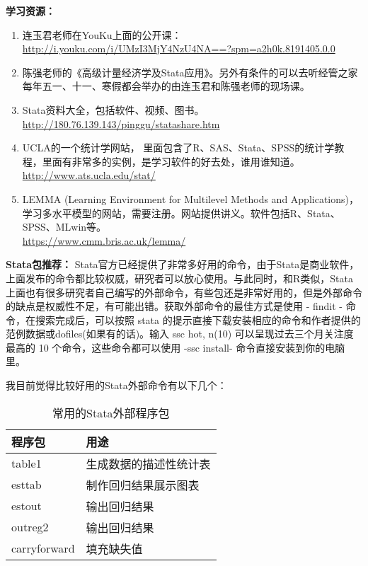 \documentclass[11pt, a4paper]{article}
\begin{document}
\textbf{学习资源：}
\begin{enumerate}[(1)]
	\item 连玉君老师在YouKu上面的公开课：\\ \url{http://i.youku.com/i/UMzI3MjY4NzU4NA==?spm=a2h0k.8191405.0.0}
	\item 陈强老师的《高级计量经济学及Stata应用》。另外有条件的可以去听经管之家每年五一、十一、寒假都会举办的由连玉君和陈强老师的现场课。
	\item Stata资料大全，包括软件、视频、图书。\\ \url{http://180.76.139.143/pinggu/statashare.htm}
	\item UCLA的一个统计学网站， 里面包含了R、SAS、Stata、SPSS的统计学教程，里面有非常多的实例，是学习软件的好去处，谁用谁知道。\\ \url{http://www.ats.ucla.edu/stat/}
	\item LEMMA (Learning Environment for Multilevel Methods and Applications)，学习多水平模型的网站，需要注册。网站提供讲义。软件包括R、Stata、SPSS、MLwin等。\\ \url{https://www.cmm.bris.ac.uk/lemma/}
\end{enumerate}

\textbf{Stata包推荐：}
Stata官方已经提供了非常多好用的命令，由于Stata是商业软件，上面发布的命令都比较权威，研究者可以放心使用。与此同时，和R类似，Stata上面也有很多研究者自己编写的外部命令，有些包还是非常好用的，但是外部命令的缺点是权威性不足，有可能出错。获取外部命令的最佳方式是使用 - findit - 命令，在搜索完成后，可以按照 stata 的提示直接下载安装相应的命令和作者提供的范例数据或dofiles(如果有的话)。输入 ssc hot, n(10) 可以呈现过去三个月关注度最高的 10 个命令，这些命令都可以使用 -ssc install- 命令直接安装到你的电脑里。

我目前觉得比较好用的Stata外部命令有以下几个：
\begin{table}[H]
\caption{常用的Stata外部程序包}
	\centering
	\begin{threeparttable}
		\begin{tabular}{lp{6cm}}
			\toprule
			程序包 & 用途 \\
			\midrule
			table1 & 生成数据的描述性统计表 \\
			esttab & 制作回归结果展示图表 \\
			estout & 输出回归结果 \\
			outreg2 & 输出回归结果\\
			carryforward & 填充缺失值\\
			\bottomrule		
		\end{tabular}		
	\end{threeparttable}	
\end{table}
\end{document}
